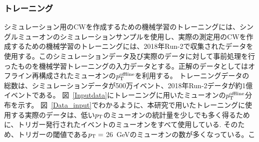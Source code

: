 \subsubsection{トレーニング}
シミュレーション用のCWを作成するための機械学習のトレーニングには、シングルミューオンのシミュレーションサンプルを使用し、実際の測定用のCWを作成するための機械学習のトレーニングには、2018年Run-2で収集されたデータを使用する。このシミュレーションデータ及び実際のデータに対して事前処理を行ったものを機械学習トレーニングの入力データとする。正解のデータとしてはオフライン再構成されたミューオンの$p_{\rm{T}}^{\rm{offline}}$を利用する。
トレーニングデータの総数は、シミュレーションデータが500万イベント、2018年Run-2データが約1億イベントである。
図~\ref{Inputdata}にトレーニングに用いたミューオンの$p_{\rm{T}}^{\rm{offline}}$分布を示す。
図~\ref{Data_input}でわかるように、本研究で用いたトレーニングに使用する実際のデータは、低い$p_{\rm{T}}$のミューオンの統計量を少しでも多く得るために、トリガー発行されたイベントのミューオンをすべて使用している.
そのため、トリガーの閾値である$p_{\rm{T}}=$ 26~GeVのミューオンの数が多くなっている。こ
